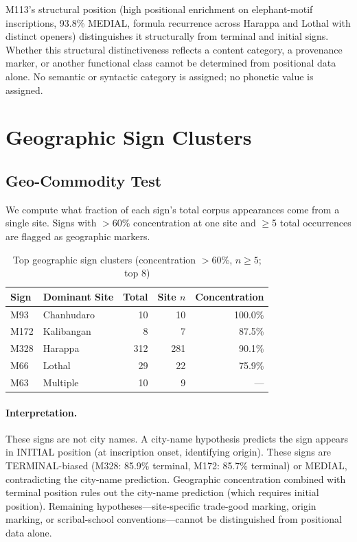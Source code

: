 \documentclass[12pt,letterpaper]{article}
\begin{document}
M113's structural position (high positional enrichment on
elephant-motif inscriptions, 93.8\% MEDIAL, formula recurrence
across Harappa and Lothal with distinct openers) distinguishes it
structurally from terminal and initial signs.
Whether this structural distinctiveness reflects a content category,
a provenance marker, or another functional class cannot be determined
from positional data alone.
No semantic or syntactic category is assigned; no phonetic value
is assigned.

\section{Geographic Sign Clusters}
\label{sec:geo}

\subsection{Geo-Commodity Test}

We compute what fraction of each sign's total corpus appearances
come from a single site.
Signs with $>$60\% concentration at one site and $\geq$5 total
occurrences are flagged as geographic markers.

\begin{table}[htbp]
\centering
\caption{Top geographic sign clusters (concentration $>$60\%, $n \geq 5$; top 8)}
\begin{tabular}{llrrr}
\toprule
Sign & Dominant Site & Total & Site $n$ & Concentration \\
\midrule
M93  & Chanhudaro & 10 & 10 & 100.0\% \\
M172 & Kalibangan &  8 &  7 & 87.5\% \\
M328 & Harappa & 312 & 281 & 90.1\% \\
M66  & Lothal  &  29 &  22 & 75.9\% \\
M63  & Multiple &  10 &  9 & --- \\
\bottomrule
\end{tabular}
\end{table}

\paragraph{Interpretation.}
These signs are not city names.
A city-name hypothesis predicts the sign appears in INITIAL position
(at inscription onset, identifying origin).
These signs are TERMINAL-biased (M328: 85.9\% terminal,
M172: 85.7\% terminal) or MEDIAL, contradicting the city-name
prediction.
Geographic concentration combined with terminal position rules out
the city-name prediction (which requires initial position).
Remaining hypotheses---site-specific trade-good marking, origin
marking, or scribal-school conventions---cannot be distinguished
from positional data alone.
\end{document}
